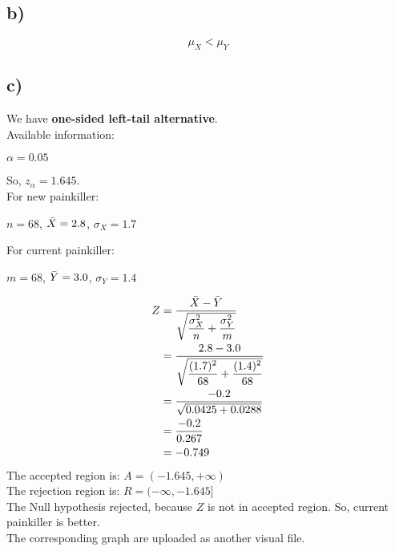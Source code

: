 \documentclass[12pt]{article}
\begin{document}
\subsection*{b)}
\begin{equation}
    \mu_X < \mu_Y
\end{equation}
\subsection*{c)}
We have \textbf{one-sided left-tail alternative}.\\
Available information:\\
\begin{center}
    $\alpha = 0.05$
\end{center}
So, $z_{\alpha} = 1.645$.\\
For new painkiller:
\begin{center}
    $n = 68$, $\Bar{X} = 2.8$, $\sigma_X = 1.7$
\end{center}
For current painkiller:
\begin{center}
    $m = 68$, $\Bar{Y} = 3.0$, $\sigma_Y = 1.4$
\end{center}
\begin{equation}
    \begin{split}
        Z &= \dfrac{\Bar{X} - \Bar{Y}}{\sqrt{\dfrac{\sigma^2_X}{n} + \dfrac{\sigma^2_Y}{m}}} \\
        &= \dfrac{2.8-3.0}{\sqrt{\dfrac{(1.7)^2}{68} + \dfrac{(1.4)^2}{68}}} \\
        &= \dfrac{-0.2}{\sqrt{0.0425+0.0288}}\\
        &= \dfrac{-0.2}{0.267}\\
        &= -0.749
    \end{split}
\end{equation}
The accepted region is: $A = (-1.645, + \infty)$ \\
The rejection region is: $R = (-\infty, -1.645]$ \\
The Null hypothesis rejected, because $Z$ is not in accepted region. So, current painkiller is better. \\
The corresponding graph are uploaded as another visual file.
\end{document}
